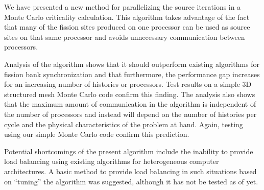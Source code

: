 We have presented a new method for parallelizing the source iterations
in a Monte Carlo criticality calculation. This algorithm takes
advantage of the fact that many of the fission sites produced on one
processor can be used as source sites on that same processor and
avoids unnecessary communication between processors.

Analysis of the algorithm shows that it should outperform existing
algorithms for fission bank synchronization and that furthermore, the
performance gap increases for an increasing number of histories or
processors. Test results on a simple 3D structured mesh Monte Carlo
code confirm this finding. The analysis also shows that the maximum
amount of communication in the algorithm is independent of the number
of processors and instead will depend on the number of histories per
cycle and the physical characteristics of the problem at hand. Again,
testing using our simple Monte Carlo code confirm this prediction.

Potential shortcomings of the present algorithm include the inability
to provide load balancing using existing algorithms for heterogeneous
computer architectures. A basic method to provide load balancing in
such situations based on ``tuning'' the algorithm was suggested,
although it has not be tested as of yet.
